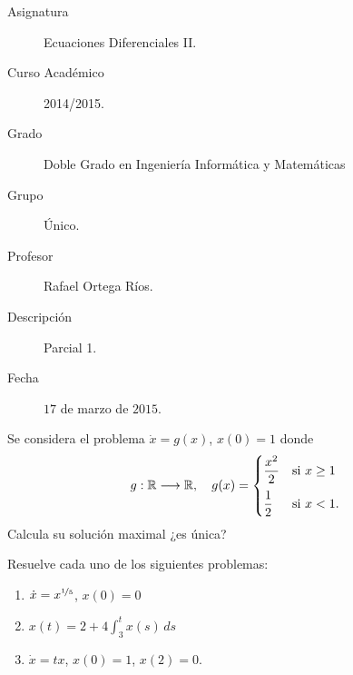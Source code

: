 \documentclass[12pt]{article}
\begin{document}

    
    

    \begin{description}
        \item[Asignatura] Ecuaciones Diferenciales II.
        \item[Curso Académico] 2014/2015.
        \item[Grado] Doble Grado en Ingeniería Informática y Matemáticas
        \item[Grupo] Único.
        \item[Profesor] Rafael Ortega Ríos.
        \item[Descripción] Parcial 1.
        \item[Fecha] $17$ de marzo de $2015$.
    
    \end{description}
    \newpage


    
    \begin{ejercicio}
        Se considera el problema $\dot{x} = g(x)$, $x(0) = 1$ donde
        \[
        g : \mathbb{R} \longrightarrow \mathbb{R}, \quad g(x) = \begin{cases} 
            \dfrac{x^2}{2} & \text{si } x \geq 1 \\[2ex]
            \dfrac{1}{2} & \text{si } x < 1.
        \end{cases}
        \]
        Calcula su solución maximal ¿es única?
    \end{ejercicio}

    \begin{ejercicio}
        Resuelve cada uno de los siguientes problemas:
        \begin{enumerate}[label=\alph*)]
            \item $\dot{x} = x^{\nicefrac{1}{5}}$, $x(0) = 0$
            \item $x(t) = 2 + 4 \displaystyle\int_3^t x(s) \, ds$
            \item $\dot{x} = tx$, $x(0) = 1$, $x(2) = 0$.
        \end{enumerate}
    \end{ejercicio}
\end{document}
